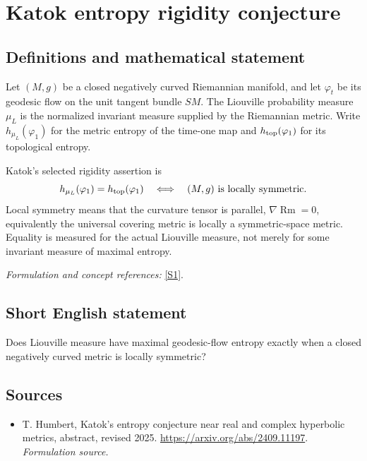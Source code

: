 \documentclass[11pt]{article}
\begin{document}
\section*{\texorpdfstring{Katok entropy rigidity conjecture}{Katok entropy rigidity conjecture}}\label{459}
\subsection{Definitions and mathematical statement}
Let $(M,g)$ be a closed negatively curved Riemannian manifold, and let $\varphi_t$ be its geodesic flow on the unit tangent bundle $SM$. The Liouville probability measure $\mu_L$ is the normalized invariant measure supplied by the Riemannian metric. Write $h_{\mu_L}(\varphi_1)$ for the metric entropy of the time-one map and $h_{\rm top}(\varphi_1)$ for its topological entropy.

Katok's selected rigidity assertion is
\[
 h_{\mu_L}(\varphi_1)=h_{\rm top}(\varphi_1)
 \quad\Longleftrightarrow\quad (M,g)\text{ is locally symmetric}.
\]
Local symmetry means that the curvature tensor is parallel, $\nabla\operatorname{Rm}=0$, equivalently the universal covering metric is locally a symmetric-space metric. Equality is measured for the actual Liouville measure, not merely for some invariant measure of maximal entropy.
\par\smallskip\textit{Formulation and concept references:} \href{https://arxiv.org/abs/2409.11197}{[S1]}.

\subsection{Short English statement}
Does Liouville measure have maximal geodesic-flow entropy exactly when a closed negatively curved metric is locally symmetric?
\subsection{Sources}
\begin{itemize}
\item[S1]T. Humbert, Katok's entropy conjecture near real and complex hyperbolic metrics, abstract, revised 2025.
\url{https://arxiv.org/abs/2409.11197}.
\textit{Formulation source.}
\end{itemize}
\end{document}
